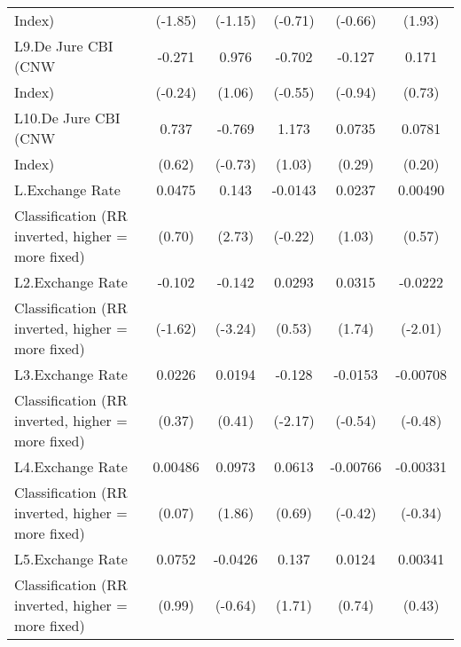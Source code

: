 {\begin{tabular}{l*{5}{c}}
Index)              &     (-1.85)         &     (-1.15)         &     (-0.71)         &     (-0.66)         &      (1.93)         \\
[1em]
L9.De Jure CBI (CNW &      -0.271         &       0.976         &      -0.702         &      -0.127         &       0.171         \\
Index)              &     (-0.24)         &      (1.06)         &     (-0.55)         &     (-0.94)         &      (0.73)         \\
[1em]
L10.De Jure CBI (CNW&       0.737         &      -0.769         &       1.173         &      0.0735         &      0.0781         \\
Index)              &      (0.62)         &     (-0.73)         &      (1.03)         &      (0.29)         &      (0.20)         \\
[1em]
L.Exchange Rate     &      0.0475         &       0.143\sym{**} &     -0.0143         &      0.0237         &     0.00490         \\
Classification (RR inverted, higher = more fixed)&      (0.70)         &      (2.73)         &     (-0.22)         &      (1.03)         &      (0.57)         \\
[1em]
L2.Exchange Rate    &      -0.102         &      -0.142\sym{**} &      0.0293         &      0.0315         &     -0.0222\sym{*}  \\
Classification (RR inverted, higher = more fixed)&     (-1.62)         &     (-3.24)         &      (0.53)         &      (1.74)         &     (-2.01)         \\
[1em]
L3.Exchange Rate    &      0.0226         &      0.0194         &      -0.128\sym{*}  &     -0.0153         &    -0.00708         \\
Classification (RR inverted, higher = more fixed)&      (0.37)         &      (0.41)         &     (-2.17)         &     (-0.54)         &     (-0.48)         \\
[1em]
L4.Exchange Rate    &     0.00486         &      0.0973         &      0.0613         &    -0.00766         &    -0.00331         \\
Classification (RR inverted, higher = more fixed)&      (0.07)         &      (1.86)         &      (0.69)         &     (-0.42)         &     (-0.34)         \\
[1em]
L5.Exchange Rate    &      0.0752         &     -0.0426         &       0.137         &      0.0124         &     0.00341         \\
Classification (RR inverted, higher = more fixed)&      (0.99)         &     (-0.64)         &      (1.71)         &      (0.74)         &      (0.43)         \\

\end{tabular}}
